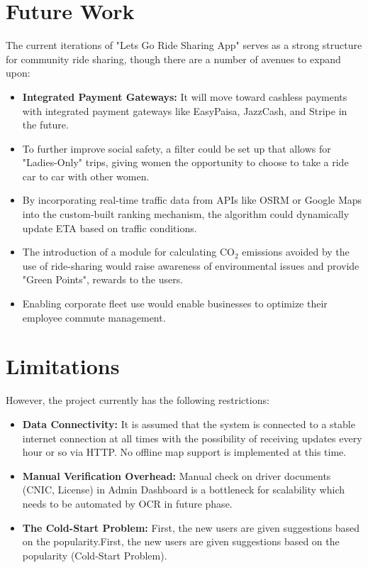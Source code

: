 \section{Future Work}

The current iterations of "Lets Go Ride Sharing App" serves as a strong structure for community ride sharing, though there are a number of avenues to expand upon:

\begin{itemize}
    \item \textbf{Integrated Payment Gateways:} It will move toward cashless payments with integrated payment gateways like EasyPaisa, JazzCash, and Stripe in the future.
    \item To further improve social safety, a filter could be set up that allows for "Ladies-Only" trips, giving women the opportunity to choose to take a ride car to car with other women.
    \item By incorporating real-time traffic data from APIs like OSRM or Google Maps into the custom-built ranking mechanism, the algorithm could dynamically update ETA based on traffic conditions.
    \item The introduction of a module for calculating CO$_2$ emissions avoided by the use of ride-sharing would raise awareness of environmental issues and provide "Green Points", rewards to the users.
    \item Enabling corporate fleet use would enable businesses to optimize their employee commute management.
\end{itemize}


\section{Limitations}

However, the project currently has the following restrictions:

\begin{itemize}
    \item \textbf{Data Connectivity:} It is assumed that the system is connected to a stable internet connection at all times with the possibility of receiving updates every hour or so via HTTP. No offline map support is implemented at this time.
    \item \textbf{Manual Verification Overhead:} Manual check on driver documents (CNIC, License) in Admin Dashboard is a bottleneck for scalability which needs to be automated by OCR in future phase.
    \item \textbf{The Cold-Start Problem:} First, the new users are given suggestions based on the popularity.First, the new users are given suggestions based on the popularity (Cold-Start Problem).
\end{itemize}
